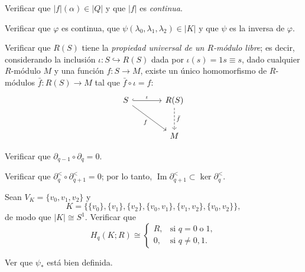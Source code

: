 \begin{ejercicio}
Verificar que $|f|(\alpha) \in |Q|$ y que $|f|$ es \textit{continua}.
\end{ejercicio}

\begin{ejercicio}
Verificar que $\varphi$ es continua, que $\psi(\lambda_0, \lambda_1, \lambda_2) \in |K|$ y que $\psi$ es la inversa de $\varphi$.
\end{ejercicio}

\begin{ejercicio}
Verificar que $R(S)$ tiene la \textit{propiedad universal de un $R$-módulo libre}; es decir, considerando la inclusión $\iota \colon S \hookrightarrow R(S)$ dada por $\iota(s) = 1s \equiv s$, dado cualquier $R$-módulo $M$ y una función $f \colon S \to M$, existe un único homomorfismo de $R$-módulos $\bar{f} \colon R(S) \to M$ tal que $\bar{f} \circ \iota = f$:
\[
\begin{tikzcd}[row sep=large, column sep=large]
S \arrow[r, "\iota", hook] \arrow[dr, "f"'] & R(S) \arrow[d, "\bar{f}", dashed] \\
& M
\end{tikzcd}
\]
\end{ejercicio}

\begin{ejercicio}
Verificar que ${\partial_{q-1} \circ \partial_q = 0}$.
\end{ejercicio}

\begin{ejercicio}
Verificar que $\partial_q^< \circ \partial_{q+1}^< = 0$; por lo tanto, $\operatorname{Im} \partial_{q+1}^< \subset \ker \partial_q^<$.
\end{ejercicio}

\begin{ejercicio}
Sean $V_K = \{v_0, v_1, v_2\}$ y
\[
K = \big\{ \{v_0\}, \{v_1\}, \{v_2\}, \{v_0, v_1\}, \{v_1, v_2\}, \{v_0, v_2\} \big\},
\]
de modo que $|K| \cong S^1$. Verificar que
\[
H_q(K; R) \cong 
\begin{cases}
    R, & \text{si } q = 0 \; \text{o} \; 1, \\
    0, & \text{si } q \neq 0, 1.
\end{cases}
\]
\end{ejercicio}

\begin{ejercicio}
    Ver que $\psi_*$ está bien definida.
\end{ejercicio}

